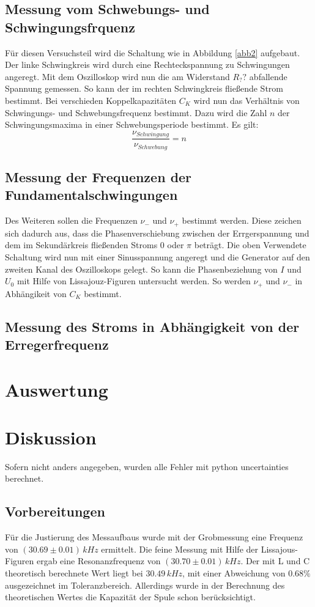 \documentclass[11pt,ngerman,a4paper]{article}
\begin{document}
\subsection{Messung vom Schwebungs- und Schwingungsfrquenz}
Für diesen Versuchsteil wird die Schaltung wie in Abbildung \ref{abb2} aufgebaut. Der linke Schwingkreis wird durch eine Rechteckspannung zu Schwingungen angeregt. Mit dem Oszilloskop wird nun die am Widerstand $R_??$ abfallende Spannung gemessen. So kann der im rechten Schwingkreis fließende Strom bestimmt. Bei verschieden Koppelkapazitäten $C_K$ wird nun das Verhältnis von Schwingungs- und Schwebungsfrequenz bestimmt. Dazu wird die Zahl $n$ der Schwingungsmaxima in einer Schwebungsperiode bestimmt. Es gilt:
\begin{equation}
\frac{\nu_{Schwingung}}{\nu_{Schwebung}} = n
\end{equation}
\subsection{Messung der Frequenzen der Fundamentalschwingungen}
Des Weiteren sollen die Frequenzen $\nu_-$ und $\nu_+$ bestimmt werden. Diese zeichen sich dadurch aus, dass die Phasenverschiebung zwischen der Errgerspannung und dem im Sekundärkreis fließenden Stroms $0$ oder $\pi$ beträgt. Die oben Verwendete Schaltung wird nun mit einer Sinusspannung angeregt und die Generator auf den zweiten Kanal des Oszilloskops gelegt. So kann die Phasenbeziehung von $I$ und $U_0$ mit Hilfe von Lissajouz-Figuren untersucht werden. So werden $\nu_+$ und $\nu_-$ in Abhängikeit von $C_K$ bestimmt.
\subsection{Messung des Stroms in Abhängigkeit von der Erregerfrequenz}


\section{Auswertung}

\section{Diskussion}
Sofern nicht anders angegeben, wurden alle Fehler mit python uncertainties berechnet.
\subsection{Vorbereitungen}
Für die Justierung des Messaufbaus wurde mit der Grobmessung eine Frequenz von $(30.69\pm0.01)\,kHz$ ermittelt. Die feine Messung mit Hilfe der Lissajous-Figuren ergab eine Resonanzfrequenz von $(30.70\pm0.01) \, kHz$. Der mit L und C theoretisch berechnete Wert liegt bei $30.49 \, kHz$, mit einer Abweichung von $0.68 \%$ ausgezeichnet im Toleranzbereich. Allerdings wurde in der Berechnung des theoretischen Wertes die Kapazität der Spule schon berücksichtigt.
\end{document}
